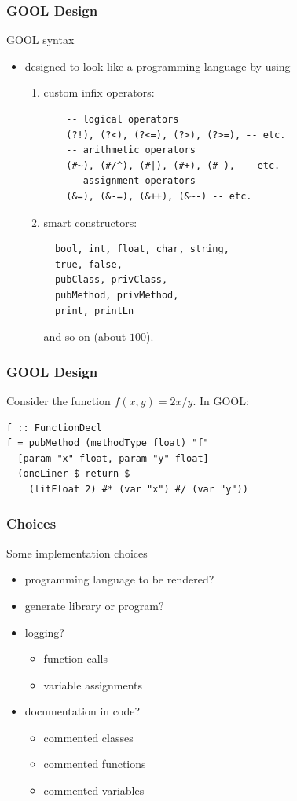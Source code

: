 \documentclass{beamer}
\begin{document}
\begin{frame}
\frametitle{GOOL Design}
{\Large GOOL syntax}
\begin{itemize}
\item designed to look like a programming language by using
\begin{enumerate}
\item<2-> custom infix operators:
\begin{lstlisting}
    -- logical operators
    (?!), (?<), (?<=), (?>), (?>=), -- etc.
    -- arithmetic operators
    (#~), (#/^), (#|), (#+), (#-), -- etc.
    -- assignment operators
    (&=), (&-=), (&++), (&~-) -- etc.
\end{lstlisting}
\item<3-> smart constructors:
\begin{lstlisting}
  bool, int, float, char, string,
  true, false,
  pubClass, privClass, 
  pubMethod, privMethod,
  print, printLn
\end{lstlisting}
and so on (about $100$).
\end{enumerate}
\end{itemize}
\end{frame}

\begin{frame}
\frametitle{GOOL Design}
Consider the function $f(x, y) = 2x/y$.  In GOOL:
\begin{lstlisting}
f :: FunctionDecl
f = pubMethod (methodType float) "f"
  [param "x" float, param "y" float] 
  (oneLiner $ return $ 
    (litFloat 2) #* (var "x") #/ (var "y"))
\end{lstlisting}
\end{frame}


\begin{frame}
\frametitle{Choices}
{\Large Some implementation choices}
\begin{itemize}
\item programming language to be rendered?
\pause
\item generate library or program?
\pause
\item logging?
\begin{itemize}
\item function calls
\item variable assignments
\end{itemize}
\pause
\item documentation in code?
\begin{itemize}
\item commented classes
\item commented functions
\item commented variables 
\end{itemize}
\end{itemize}
\end{frame}
\end{document}
